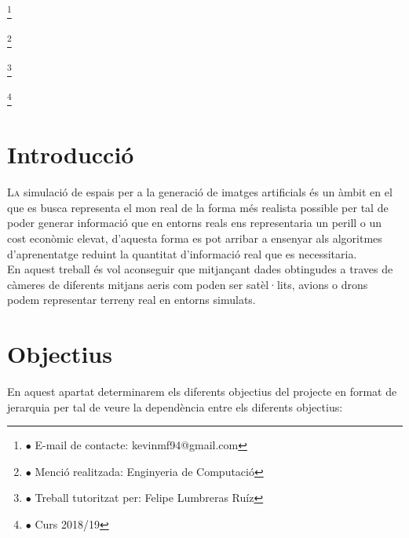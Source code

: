 \documentclass[10pt,a4paper,twocolumn,twoside]{article}
\newcommand\blfootnote[1]{%
  \begingroup
  \renewcommand\thefootnote{}\footnote{#1}%
  \addtocounter{footnote}{-1}%
  \endgroup
}
\begin{document}
\blfootnote{$\bullet$ E-mail de contacte: kevinmf94@gmail.com}
\blfootnote{$\bullet$ Menció realitzada: Enginyeria de Computació}
\blfootnote{$\bullet$ Treball tutoritzat per: Felipe Lumbreras Ruíz}
\blfootnote{$\bullet$ Curs 2018/19}

\vspace{-1cm}
\section{Introducció}

\lettrine[lines=2]{L}{a} simulació de espais per a la generació de imatges artificials és un àmbit en el que es busca representa el mon real de la forma més realista possible per tal de poder generar informació que en entorns reals ens representaria un perill o un cost econòmic elevat, d'aquesta forma es pot arribar a ensenyar als algoritmes d'aprenentatge reduint la quantitat d'informació real que es necessitaria.\\
En aquest treball és vol aconseguir que mitjançant dades obtingudes a traves de càmeres de diferents mitjans aeris com poden ser satèl·lits, avions o drons podem representar terreny real en entorns simulats.

\section{Objectius}

En aquest apartat determinarem els diferents objectius del projecte en format de jerarquia per tal de veure la dependència entre els diferents objectius:
\end{document}
